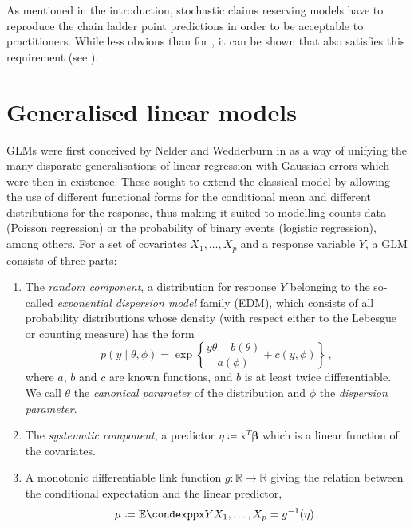 \documentclass[a4paper]{book}
\begin{document}
As mentioned in the introduction, stochastic claims reserving models have to reproduce the chain ladder point predictions in order to be acceptable to practitioners. While less obvious than for , it can be shown that  also satisfies this requirement (see \cite[Lemma 2.16]{wuthrich:stochastic-reserving}).

\section{Generalised linear models} \label{sec:glm}

GLMs were first conceived by Nelder and Wedderburn in \cite{nelder} as a way of unifying the many disparate generalisations of linear regression with Gaussian errors which were then in existence. These sought to extend the classical model by allowing the use of different functional forms for the conditional mean and different distributions for the response, thus making it suited to modelling counts data (Poisson regression) or the probability of binary events (logistic regression), among others. For a set of covariates $X_1, \dots, X_p$ and a response variable $Y$, a GLM consists of three parts:
\begin{enumerate}
  \item The \emph{random component}, a distribution for response $Y$ belonging to the so-called \emph{exponential dispersion model} family (EDM), which consists of all probability distributions whose density (with respect either to the Lebesgue or counting measure) has the form
        \begin{equation} \label{eq:exp-disp-fam}
          p(y \mid \theta, \phi) = \exp \left \{ \frac{y \theta - b(\theta)}{a(\phi)} + c(y, \phi) \right \} \,,
        \end{equation}
        where $a$, $b$ and $c$ are known functions, and $b$ is at least twice differentiable. We call $\theta$ the \emph{canonical parameter} of the distribution and $\phi$ the \emph{dispersion parameter}.
  \item The \emph{systematic component}, a predictor $\eta \coloneqq \bm{\mathrm{x}}^T \bm{\beta}$ which is a linear function of the covariates.
  \item A monotonic differentiable link function $g: \mathbb{R} \rightarrow \mathbb{R}$ giving the relation between the conditional expectation and the linear predictor,
        \begin{equation}
          \mu \coloneqq \condexpp{Y}{X_1, \dots, X_p} = g^{-1}(\eta) \,.
        \end{equation}
\end{enumerate}
\end{document}
